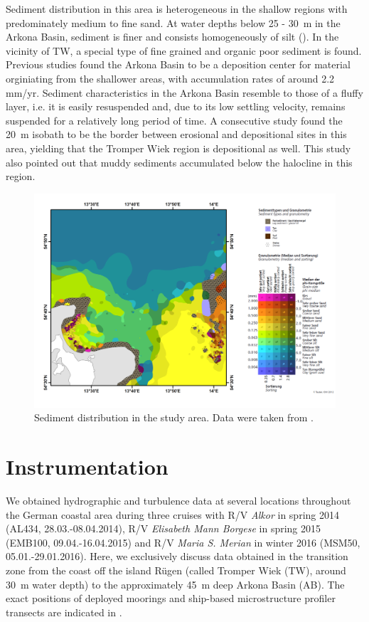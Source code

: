   Sediment distribution in this area is heterogeneous in the shallow regions 
with predominately medium to fine sand. At water depths below 25 - 30~m in the 
Arkona Basin, sediment is finer and consists homogeneously of silt 
(). In the vicinity of TW, a special type of fine grained and 
organic poor sediment is found. Previous studies \citep[][]{leipe2000, 
basys1} found the Arkona Basin to be a deposition center for material 
orginiating from the shallower areas, with accumulation rates of around 2.2 
mm/yr. Sediment characteristics in the Arkona Basin resemble to those of a 
fluffy layer, i.e. it is easily resuspended and, due to its low settling 
velocity, remains suspended for a relatively long period of time. A consecutive 
study \citep[][]{basys2} found the 20~m isobath to be the border between 
erosional and depositional sites in this area, yielding that the Tromper Wiek 
region is depositional as well. This study also pointed out that muddy 
sediments accumulated below the halocline in this region.
 \begin{figure}[ht]
\includegraphics[width=30pc]{bilder/TW.pdf}
 \caption{Sediment distribution in the study area. Data were taken from 
\cite{tauber2012}.}
 \label{tauberkarte}
 \end{figure}

\section{Instrumentation}

We obtained hydrographic and turbulence data at 
several locations throughout the German coastal area during three cruises with 
R/V \textit{Alkor} in spring 2014 (AL434, 28.03.-08.04.2014), R/V 
\textit{Elisabeth Mann Borgese} in spring 2015 (EMB100, 09.04.-16.04.2015) and 
R/V \textit{Maria S. Merian} in winter 2016 (MSM50, 05.01.-29.01.2016). Here, 
we exclusively discuss data obtained in the transition zone from the coast off 
the island R\"{u}gen (called Tromper Wiek (TW), around 30~m water depth) to 
the approximately 45~m deep Arkona Basin (AB). The exact positions of deployed 
moorings and ship-based microstructure profiler transects are indicated in 
.

